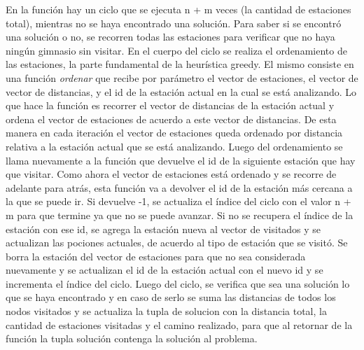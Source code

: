             En la función hay un ciclo que se ejecuta n + m veces (la cantidad de estaciones total), mientras no se haya encontrado una solución. Para saber si se encontró una solución o no, se recorren todas las estaciones para verificar que no haya ningún gimnasio sin visitar. En el cuerpo del ciclo se realiza el ordenamiento de las estaciones, la parte fundamental de la heurística greedy. El mismo consiste en una función \textit{ordenar} que recibe por parámetro el vector de estaciones, el vector de vector de distancias, y el id de la estación actual en la cual se está analizando. Lo que hace la función es recorrer el vector de distancias de la estación actual y ordena el vector de estaciones de acuerdo a este vector de distancias. De esta manera en cada iteración el vector de estaciones queda ordenado por distancia relativa a la estación actual que se está analizando. Luego del ordenamiento se llama nuevamente a la función que devuelve el id de la siguiente estación que hay que visitar. Como ahora el vector de estaciones está ordenado y se recorre de adelante para atrás, esta función va a devolver el id de la estación más cercana a la que se puede ir. Si devuelve -1, se actualiza el índice del ciclo con el valor n + m para que termine ya que no se puede avanzar. Si no se recupera el índice de la estación con ese id, se agrega la estación nueva al vector de visitados y se actualizan las pociones actuales, de acuerdo al tipo de estación que se visitó. Se borra la estación del vector de estaciones para que no sea considerada nuevamente y se actualizan el id de la estación actual con el nuevo id y se incrementa el índice del ciclo. Luego del ciclo, se verifica que sea una solución lo que se haya encontrado y en caso de serlo se suma las distancias de todos los nodos visitados y se actualiza la tupla de solucion con la distancia total, la cantidad de estaciones visitadas y el camino realizado, para que al retornar de la función la tupla solución contenga la solución al problema. 